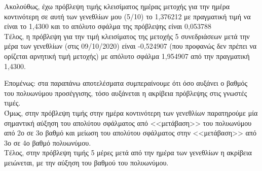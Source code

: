 \documentclass[a4paper,11pt]{article}
\begin{document}
Ακολούθως, έχω πρόβλεψη τιμής κλεισίματος ημέρας μετοχής για την ημέρα κοντινότερη σε αυτή των γενεθλίων μου (5/10) το 1,376212 με πραγματική τιμή να είναι το 1,4300 και το απόλυτο σφάλμα της πρόβλεψης είναι 0,053788\\

Τέλος, η πρόβλεψη για την τιμή κλεισίματος της μετοχής 5 συνεδριάσεων μετά την μέρα των γενεθλίων (στις 09/10/2020) είναι -0,524907 (που προφανώς δεν πρέπει να ορίζεται αρνητική τιμή μετοχής) με απόλυτο σφάλμα 1,954907 από την πραγματική 1,4300.\\

\par
Επομένως: στα παραπάνω αποτελέσματα συμπεραίνουμε ότι όσο αυξάνει ο βαθμός του πολυωνύμου προσέγγισης, τόσο αυξάνεται η ακρίβεια πρόβλεψης στις γνωστές τιμές.\\
Όμως, στην πρόβλεψη τιμής στην ημέρα κοντινότερη των γενεθλίων παρατηρούμε μία σημαντική αύξηση του απολύτου σφάλματος από <<μετάβαση>> του πολυωνύμου από 2ο σε 3ο βαθμό και μείωση του απολύτου σφάλματος στην <<μετάβαση>> από 3ο σε 4ο βαθμό πολυωνύμου.\\
Τέλος, στην πρόβλεψη τιμής 5 μέρες μετά από την ημέρα των γενεθλίων η ακρίβεια μειώνεται, με την αύξηση του βαθμού του πολυωνύμου.
\end{document}
